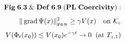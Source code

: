 \documentclass[preview]{standalone}
\begin{document}
\begin{align*}
\special{dvisvgm:raw <g id='unique000'>}\mathbf{Fig\;6.3\;\&\;Def\;6.9\;(PL\;Coercivity):}\\[4pt]\|\operatorname{grad}\Psi(x)\|_{g_{\mathfrak{AR}}}^2 \ge \gamma V(x)\quad\text{on }\mathcal{K}_c\\[4pt]V(\Phi_t(x_0)) \le V(x_0)e^{-\gamma t}\to 0\;\;(\text{at }T_{z,1})\special{dvisvgm:raw </g>}
\end{align*}
\end{document}
